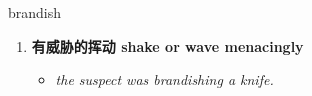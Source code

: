 
\begin{frame}
{\huge brandish}
\begin{center}
\begin{enumerate}\Large
  \item \textbf{有威胁的挥动 shake or wave menacingly}
  \begin{itemize}
    \item \em{\Large{the suspect was brandishing a knife.}}
  \end{itemize}
\end{enumerate}
\end{center}
\end{frame}
